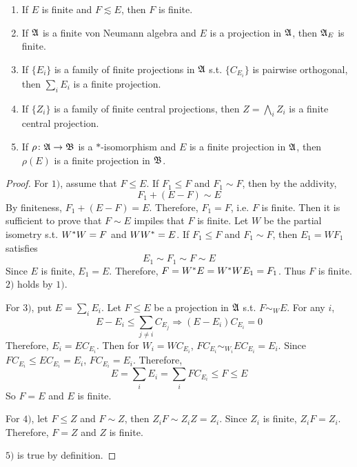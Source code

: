 \begin{prop}
	\begin{enumerate}[label=\arabic*)]
		\item If $E$ is finite and $F \lesssim E$, then $F$ is finite.
		\item If $\mathfrak{A}$ is a finite von Neumann algebra and $E$ is a projection in $\mathfrak{A}$, then $\mathfrak{A}_E$ is finite.
		\item If $\{E_i\}$ is a family of finite projections in $\mathfrak{A}$ s.t. $\{C_{E_i}\}$ is pairwise orthogonal, then $\sum_i E_i$ is a finite projection.
		\item If $\{Z_i\}$ is a family of finite central projections, then $Z = \bigwedge_i Z_i$ is a finite central projection.
		\item If $\rho \colon \mathfrak{A} \rightarrow \mathfrak{B}$ is a $*$-isomorphism and $E$ is a finite projection in $\mathfrak{A}$, then $\rho(E)$ is a finite projection in $\mathfrak{B}$.
	\end{enumerate}
\end{prop}
\begin{proof}
	For $1)$, assume that $F \leqslant E$. If $F_1 \leqslant F$ and $F_1 \sim F$, then by the addivity, 
	\begin{equation*}
		F_1 + (E - F) \sim E
	\end{equation*}
	By finiteness, $F_1 + (E - F) = E$. Therefore, $F_1 = F$, i.e. $F$ is finite. Then it is sufficient to prove that $F \sim E$ impiles that $F$ is finite. Let $W$ be the partial isometry s.t. $W^{*}W = F$ and $WW^{*} = E$. If $F_1 \leqslant F$ and $F_1 \sim F$, then $E_1 = WF_1$ satisfies
	\begin{equation*}
		E_1 \sim F_1 \sim F \sim E
	\end{equation*}
	Since $E$ is finite, $E_1 = E$. Therefore, $F = W^{*}E = W^{*}W E_1 = F_1$. Thus $F$ is finite. $2)$ holds by $1)$.
	\item For $3)$, put $E = \sum_i E_i$. Let $F \leqslant E$ be a projection in $\mathfrak{A}$ s.t. $F \sim_{W} E$. For any $i$, 
	\begin{equation*}
		E - E_i \leqslant \sum_{j \neq i} C_{E_j} \Rightarrow (E - E_i)C_{E_i} = 0
	\end{equation*}
	Therefore, $E_i = EC_{E_i}$. Then for $W_i = WC_{E_i}$, $FC_{E_i} \sim_{W_i} EC_{E_i} = E_i$. Since $FC_{E_i} \leqslant EC_{E_i} = E_i$, $FC_{E_i} = E_i$. Therefore,
	\begin{equation*}
		E = \sum_i E_i = \sum_i FC_{E_i} \leqslant F \leqslant E
	\end{equation*}
	So $F = E$ and $E$ is finite.
	\item For $4)$, let $F \leqslant Z$ and $F \sim Z$, then $Z_i F \sim Z_i Z = Z_i$. Since $Z_i$ is finite, $Z_i F = Z_i$. Therefore, $F = Z$ and $Z$ is finite.
	\item $5)$ is true by definition.
\end{proof}

